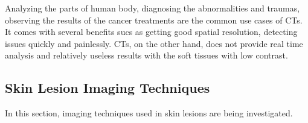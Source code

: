 \begin{itemize}
                    

                    Analyzing the parts of human body, diagnosing the abnormalities and traumas, observing the results of the cancer treatments are the common use cases of CTs.
                    It comes with several benefits sucs as getting good spatial resolution, detecting issues quickly and painlessly.
                    CTs, on the other hand, does not provide real time analysis and relatively useless results with the soft tissues with low contrast.

                

        \end{itemize}

    \subsection{Skin Lesion Imaging Techniques}

        In this section, imaging techniques used in skin lesions are being investigated.

